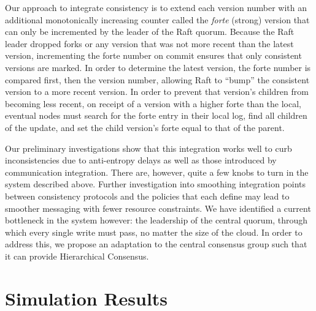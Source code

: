 \documentclass[10pt,conference,compsocconf,letterpaper]{IEEEtran}
\begin{document}
Our approach to integrate consistency is to extend each version number with an additional monotonically increasing counter called the \textit{forte} (strong) version that can only be incremented by the leader of the Raft quorum. Because the Raft leader dropped forks or any version that was not more recent than the latest version, incrementing the forte number on commit ensures that only consistent versions are marked. In order to determine the latest version, the forte number is compared first, then the version number, allowing Raft to ``bump'' the consistent version to a more recent version. In order to prevent that version's children from becoming less recent, on receipt of a version with a higher forte than the local, eventual nodes must search for the forte entry in their local log, find all children of the update, and set the child version's forte equal to that of the parent.

Our preliminary investigations show that this integration works well to curb inconsistencies due to anti-entropy delays as well as those introduced by communication integration. There are, however, quite a few knobs to turn in the system described above. Further investigation into smoothing integration points between consistency protocols and the policies that each define may lead to smoother messaging with fewer resource constraints. We have identified a current bottleneck in the system however: the leadership of the central quorum, through which every single write must pass, no matter the size of the cloud. In order to address this, we propose an adaptation to the central consensus group such that it can provide Hierarchical Consensus.

\section{Simulation Results}
\end{document}
